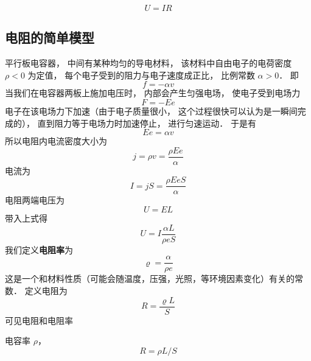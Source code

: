 

\begin{equation}
U = IR
\end{equation}


\subsection{电阻的简单模型}
平行板电容器， 中间有某种均匀的导电材料， 该材料中自由电子的电荷密度 $\rho < 0$ 为定值， 每个电子受到的阻力与电子速度成正比， 比例常数 $\alpha > 0$． 即
\begin{equation}
f = -\alpha v
\end{equation}
当我们在电容器两板上施加电压时， 内部会产生匀强电场， 使电子受到电场力
\begin{equation}
F = -Ee
\end{equation}
电子在该电场力下加速（由于电子质量很小， 这个过程很快可以认为是一瞬间完成的）， 直到阻力等于电场力时加速停止， 进行匀速运动． 于是有
\begin{equation}
Ee = \alpha v
\end{equation}
所以电阻内电流密度大小为
\begin{equation}
j = \rho v = \frac{\rho Ee}{\alpha}
\end{equation}
电流为
\begin{equation}
I = jS = \frac{\rho EeS}{\alpha}
\end{equation}
电阻两端电压为
\begin{equation}
U = EL
\end{equation}
带入上式得
\begin{equation}
U = I \frac{\alpha L}{\rho eS}
\end{equation}
我们定义\textbf{电阻率}为
\begin{equation}
\varrho = \frac{\alpha}{\rho e}
\end{equation}
这是一个和材料性质（可能会随温度，压强，光照，等环境因素变化）有关的常数． 定义电阻为
\begin{equation}
R = \frac{\varrho L}{S}
\end{equation}
可见电阻和电阻率


电容率 $\rho$， 
\begin{equation}
R = \rho L / S
\end{equation}
